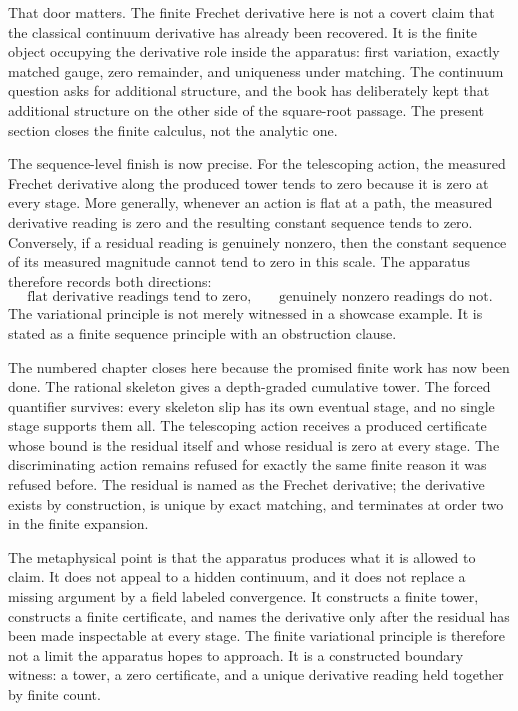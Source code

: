 That door matters. The finite Frechet derivative here is not a covert claim that
the classical continuum derivative has already been recovered. It is the finite
object occupying the derivative role inside the apparatus: first variation,
exactly matched gauge, zero remainder, and uniqueness under matching. The
continuum question asks for additional structure, and the book has deliberately
kept that additional structure on the other side of the square-root passage.
The present section closes the finite calculus, not the analytic one.

The sequence-level finish is now precise. For the telescoping action, the
measured Frechet derivative along the produced tower tends to zero because it
is zero at every stage. More generally, whenever an action is flat at a path,
the measured derivative reading is zero and the resulting constant sequence
tends to zero. Conversely, if a residual reading is genuinely nonzero, then the
constant sequence of its measured magnitude cannot tend to zero in this scale.
The apparatus therefore records both directions:
\[
  \text{flat derivative readings tend to zero,}
  \qquad
  \text{genuinely nonzero readings do not.}
\]
The variational principle is not merely witnessed in a showcase example. It is
stated as a finite sequence principle with an obstruction clause.

The numbered chapter closes here because the promised finite work has now been
done. The rational skeleton gives a depth-graded cumulative tower. The forced
quantifier survives: every skeleton slip has its own eventual stage, and no
single stage supports them all. The telescoping action receives a produced
certificate whose bound is the residual itself and whose residual is zero at
every stage. The discriminating action remains refused for exactly the same
finite reason it was refused before. The residual is named as the Frechet
derivative; the derivative exists by construction, is unique by exact matching,
and terminates at order two in the finite expansion.

The metaphysical point is that the apparatus produces what it is allowed to
claim. It does not appeal to a hidden continuum, and it does not replace a
missing argument by a field labeled convergence. It constructs a finite tower,
constructs a finite certificate, and names the derivative only after the residual
has been made inspectable at every stage. The finite variational principle is
therefore not a limit the apparatus hopes to approach. It is a constructed
boundary witness: a tower, a zero certificate, and a unique derivative reading
held together by finite count.

